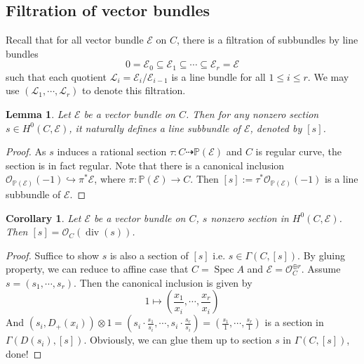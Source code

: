 \documentclass{ctexart}
\newtheorem{lemma}{Lemma}[section]
\newtheorem{corollary}{Corollary}[section]
\newcommand{\spec}{\operatorname{Spec}}
\newcommand{\divisor}{\operatorname{div}}
\begin{document}
\subsection{Filtration of vector bundles}
\label{subsection:Vector_Bundles_on_Curves_Filtration_of_vector_bundles}

Recall that for all vector bundle $\mathcal{E}$ on $C$, there is a filtration of subbundles by line bundles
\begin{equation}
    0 = \mathcal{E}_{0} \subseteq \mathcal{E}_{1} \subseteq \cdots \subseteq \mathcal{E}_{r} = \mathcal{E}  
\end{equation}
such that each quotient $\mathcal{L}_{i} = \mathcal{E}_{i}/\mathcal{E}_{i - 1}$ is a line bundle for all $1 \le i \le r$.
We may use $(\mathcal{L}_{1}, \cdots, \mathcal{L}_{r})$ to denote this filtration.
\begin{lemma}
    Let $\mathcal{E}$ be a vector bundle on $C$.
    Then for any nonzero section $s\in H^{0}(C, \mathcal{E})$, it naturally defines a line subbundle of $\mathcal{E}$, denoted by $[s]$.
    \label{Lemma 5.2}
\end{lemma}
\begin{proof}
    As $s$ induces a rational section $\tau: C \dashrightarrow \mathbb{P}(\mathcal{E})$ and $C$ is regular curve,
    the section is in fact regular.
    Note that there is a canonical inclusion $\mathcal{O}_{\mathbb{P}(\mathcal{E})}(-1) \hookrightarrow \pi^{\ast}\mathcal{E}$,
    where $\pi: \mathbb{P}(\mathcal{E}) \rightarrow C$.
    Then $[s] := \tau^{\ast}\mathcal{O}_{\mathbb{P}(\mathcal{E})}(-1)$ is a line subbundle of $\mathcal{E}$.
\end{proof}
\begin{corollary}
    Let $\mathcal{E}$ be a vector bundle on $C$, $s$ nonzero section in $H^{0}(C, \mathcal{E})$.
    Then $[s] = \mathcal{O}_{C}(\divisor (s))$.
    \label{Corollary 5.2}
\end{corollary}
\begin{proof}
    Suffice to show $s$ is also a section of $[s]$ i.e. $s\in \Gamma(C, [s])$.
    By gluing property, we can reduce to affine case that $C = \spec A$ and $\mathcal{E} = \mathcal{O}_{C}^{\oplus r}$.
    Assume $s = (s_{1}, \cdots, s_{r})$.
    Then the canonical inclusion is given by
    \begin{equation}
        1 \longmapsto (\frac{x_{1}}{x_{i}}, \cdots, \frac{x_{r}}{x_{i}})
    \end{equation}
    And $(s_{i}, D_{+}(x_{i})) \otimes 1 = (s_{i} \cdot \frac{s_{1}}{s_{i}}, \cdots, s_{i} \cdot \frac{s_{r}}{s_{i}}) = (\frac{s_{1}}{1}, \cdots, \frac{s_{r}}{1})$ is a section in $\Gamma(D(s_{i}), [s])$.
    Obviously, we can glue them up to section $s$ in $\Gamma(C, [s])$, done!
\end{proof}
\end{document}

